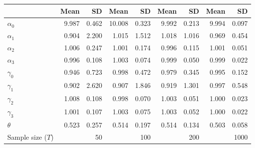 
\begin{tabular}[t]{lrrrrrrrr}
\toprule
  & Mean & SD & Mean  & SD  & Mean   & SD   & Mean    & SD   \\
\midrule
$\alpha_{0}$ & 9.987 & 0.462 & 10.008 & 0.323 & 9.992 & 0.213 & 9.994 & 0.097\\
$\alpha_{1}$ & 0.904 & 2.200 & 1.015 & 1.512 & 1.018 & 1.016 & 0.969 & 0.454\\
$\alpha_{2}$ & 1.006 & 0.247 & 1.001 & 0.174 & 0.996 & 0.115 & 1.001 & 0.051\\
$\alpha_{3}$ & 0.996 & 0.108 & 1.003 & 0.074 & 0.999 & 0.050 & 0.999 & 0.022\\
$\gamma_{0}$ & 0.946 & 0.723 & 0.998 & 0.472 & 0.979 & 0.345 & 0.995 & 0.152\\
$\gamma_{1}$ & 0.902 & 2.620 & 0.907 & 1.846 & 0.919 & 1.301 & 0.997 & 0.548\\
$\gamma_{2}$ & 1.008 & 0.108 & 0.998 & 0.070 & 1.003 & 0.051 & 1.000 & 0.023\\
$\gamma_{3}$ & 1.001 & 0.107 & 1.003 & 0.075 & 1.003 & 0.052 & 1.000 & 0.022\\
$\theta$ & 0.523 & 0.257 & 0.514 & 0.197 & 0.514 & 0.134 & 0.503 & 0.058\\
Sample size ($T$) &  & 50 &  & 100 &  & 200 &  & 1000\\
\bottomrule
\end{tabular}
